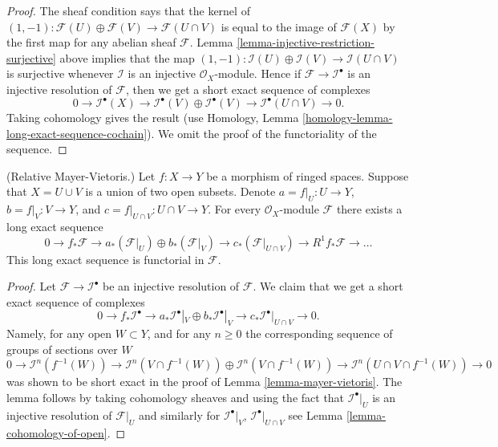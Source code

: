\begin{proof}
The sheaf condition says that the kernel of
$(1, -1) : \mathcal{F}(U) \oplus \mathcal{F}(V) \to \mathcal{F}(U \cap V)$
is equal to the image of $\mathcal{F}(X)$ by the first map
for any abelian sheaf $\mathcal{F}$.
Lemma \ref{lemma-injective-restriction-surjective} above implies that the map
$(1, -1) : \mathcal{I}(U) \oplus \mathcal{I}(V) \to \mathcal{I}(U \cap V)$
is surjective whenever $\mathcal{I}$ is an injective $\mathcal{O}_X$-module.
Hence if $\mathcal{F} \to \mathcal{I}^\bullet$ is an injective resolution
of $\mathcal{F}$, then we get a short exact sequence of complexes
$$
0 \to
\mathcal{I}^\bullet(X) \to
\mathcal{I}^\bullet(V) \oplus \mathcal{I}^\bullet(V) \to
\mathcal{I}^\bullet(U \cap V) \to
0.
$$
Taking cohomology gives the result (use
Homology, Lemma \ref{homology-lemma-long-exact-sequence-cochain}).
We omit the proof of the functoriality of the sequence.
\end{proof}

\begin{lemma}
\label{lemma-relative-mayer-vietoris}
(Relative Mayer-Vietoris.)
Let $f : X \to Y$ be a morphism of ringed spaces.
Suppose that $X = U \cup V$ is a union of two open subsets.
Denote $a = f|_U : U \to Y$, $b = f|_V : V \to Y$, and
$c = f|_{U \cap V} : U \cap V \to Y$.
For every $\mathcal{O}_X$-module $\mathcal{F}$
there exists a long exact sequence
$$
0 \to
f_*\mathcal{F} \to
a_*(\mathcal{F}|_U) \oplus b_*(\mathcal{F}|_V) \to
c_*(\mathcal{F}|_{U \cap V}) \to
R^1f_*\mathcal{F} \to \ldots
$$
This long exact sequence is functorial in $\mathcal{F}$.
\end{lemma}

\begin{proof}
Let $\mathcal{F} \to \mathcal{I}^\bullet$ be an injective resolution
of $\mathcal{F}$. We claim that we 
get a short exact sequence of complexes
$$
0 \to
f_*\mathcal{I}^\bullet \to
a_*\mathcal{I}^\bullet|_V \oplus b_*\mathcal{I}^\bullet|_V \to
c_*\mathcal{I}^\bullet|_{U \cap V} \to
0.
$$
Namely, for any open $W \subset Y$, and for any $n \geq 0$ the
corresponding sequence of groups of sections over $W$
$$
0 \to
\mathcal{I}^n(f^{-1}(W)) \to
\mathcal{I}^n(V \cap f^{-1}(W))
\oplus \mathcal{I}^n(V \cap f^{-1}(W)) \to
\mathcal{I}^n(U \cap V \cap f^{-1}(W)) \to
0
$$
was shown to be short exact in the proof of Lemma \ref{lemma-mayer-vietoris}.
The lemma follows by taking cohomology sheaves and using the fact that
$\mathcal{I}^\bullet|_U$ is an injective resolution of $\mathcal{F}|_U$
and similarly for $\mathcal{I}^\bullet|_V$, $\mathcal{I}^\bullet|_{U \cap V}$
see Lemma \ref{lemma-cohomology-of-open}.
\end{proof}




















